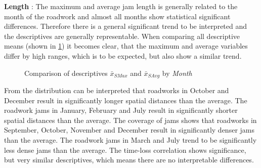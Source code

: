 \textbf{Length} : The maximum and average jam length is generally related to the month of the roadwork and almost all months show statistical significant differences. Therefore there is a general significant trend to be interpreted and the descriptives are generally representable. When comparing all descriptive means (shown in \cref{fig:arbis_matched_meancomparison_month_spatial}) it becomes clear, that the maximum and average variables differ by high ranges, which is to be expected, but also show a similar trend.
\begin{figure}[ht!]
	\data
	\pgfplotstablesort[sort key=means, sort cmp=float >]{\datasorted}{\data}
	\tiny
	\centering
	\caption{Comparison of descriptives $\bar{x}_{SMax}$ and $\bar{x}_{SAvg}$ by \textit{Month}}
	\label{fig:arbis_matched_meancomparison_month_spatial}
\end{figure}
From the distribution can be interpreted that roadworks in October and December result in significantly longer spatial distances than the average. The roadwork jams in January, February and July result in significantly shorter spatial distances than the average. The coverage of jams shows that roadworks in September, October, November and December result in significantly denser jams than the average. The roadwork jams in March and July trend to be significantly less dense jams than the average. The time-loss correlation shows significance, but very similar descriptives, which means there are no interpretable differences.


